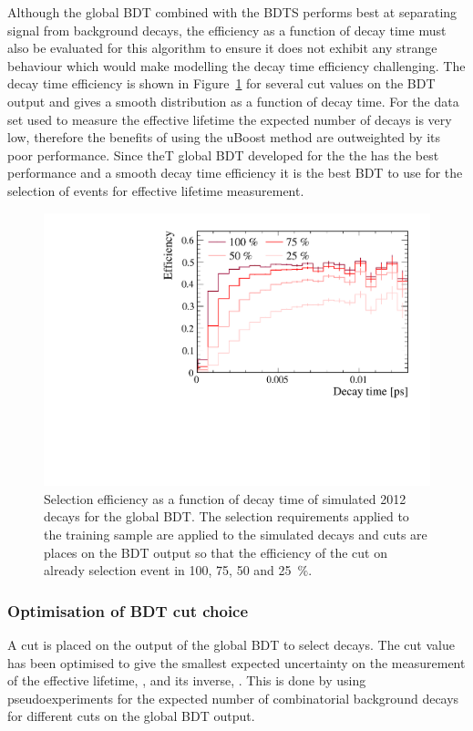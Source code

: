 Although the global BDT combined with the BDTS performs best at separating signal from background decays, the efficiency as a function of decay time must also be evaluated for this algorithm to ensure it does not exhibit any strange behaviour which would make modelling the decay time efficiency challenging. The decay time efficiency is shown in Figure~\ref{fig:accptsBFBDTs} for several cut values on the BDT output and gives a smooth distribution as a function of decay time. For the data set used to measure the \bsmumu effective lifetime the expected number of \bsmumu decays is very low, therefore the benefits of using the uBoost method are outweighted by its poor performance. Since theT global BDT developed for the the \BFm has the best performance and a smooth decay time efficiency it is the best BDT to use for the selection of events for effective lifetime measurement. 
\begin{figure}[htbp]
    \centering
        \includegraphics[width=0.6 \textwidth]{./Figs/Selection/BDT1_acceptances.pdf}
    \caption{Selection efficiency as a function of decay time of simulated 2012 \bsmumu decays for the global BDT. The selection requirements applied to the training sample are applied to the simulated decays and cuts are places on the BDT output so that the efficiency of the cut on already selection event in 100, 75, 50 and 25~$\%$. }
    \label{fig:accptsBFBDTs}
\end{figure}

\subsubsection{Optimisation of BDT cut choice}
\label{sec:globalBDToptimisation}

A cut is placed on the output of the global BDT to select \bsmumu decays. The cut value has been optimised to give the smallest expected uncertainty on the measurement of the \bsmumu effective lifetime, \tmumu, and its inverse, \invtmumu. This is done by using pseudoexperiments for the expected number of \bsmumu combinatorial background decays for different cuts on the global BDT output. %

